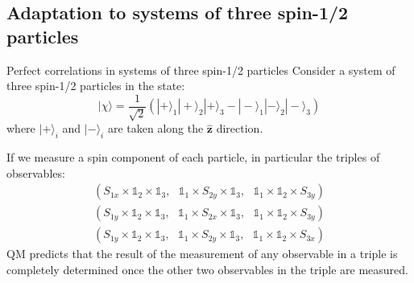 \documentclass[10pt]{beamer}
\begin{document}
\subsection{Adaptation to systems of three spin-1/2 particles}
\begin{frame}{Perfect correlations in systems of three spin-1/2 particles}
Consider a system of three spin-1/2 particles in the state:
\begin{equation*}
  |\chi\rangle = \frac{1}{\sqrt{2}} \left( |+\rangle_1 |+\rangle_2 |+\rangle_3 - |-\rangle_1 |-\rangle_2 |-\rangle_3 \right)
  \label{eq:ghz-state}
\end{equation*}
where $|+\rangle_i$ and $|-\rangle_i$ are taken along the $\mathbf{\hat{z}}$ direction.

If we measure a spin component of each particle, in particular the triples of observables:
\begin{equation*}
  \begin{split}
    \left( S_{1x} \times \mathbb{1}_2 \times \mathbb{1}_3,~~~ \mathbb{1}_1 \times S_{2y} \times \mathbb{1}_3,~~~ \mathbb{1}_1 \times \mathbb{1}_2 \times S_{3y} \right)\\
    \left( S_{1y} \times \mathbb{1}_2 \times \mathbb{1}_3,~~~ \mathbb{1}_1 \times S_{2x} \times \mathbb{1}_3,~~~ \mathbb{1}_1 \times \mathbb{1}_2 \times S_{3y} \right)\\
    \left( S_{1y} \times \mathbb{1}_2 \times \mathbb{1}_3,~~~ \mathbb{1}_1 \times S_{2y} \times \mathbb{1}_3,~~~ \mathbb{1}_1 \times \mathbb{1}_2 \times S_{3x} \right)
  \end{split}
  \label{eq:xyy-observables-triplets}
\end{equation*}
QM predicts that the result of the measurement of any observable in a triple is completely determined once the other two observables in the triple are measured.
\end{frame}
\end{document}

